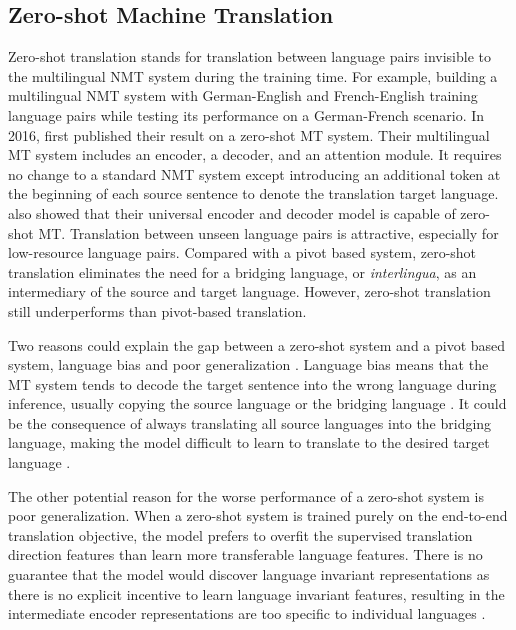 \documentclass[thesis,fonts=libertine]{cluu}
\begin{document}
\subsection{Zero-shot Machine Translation}
\label{sec:zero_shot_mt}

Zero-shot translation stands for translation between language pairs invisible to the multilingual NMT system during the training time. For example, building a multilingual NMT system with German-English and French-English training language pairs while testing its performance on a German-French scenario. In 2016, \textcite{Johnson:2016aa} first published their result on a zero-shot MT system. Their multilingual MT system includes an encoder, a decoder, and an attention module. It requires no change to a standard NMT system except introducing an additional token at the beginning of each source sentence to denote the translation target language. \textcite{Ha:2016aa} also showed that their universal encoder and decoder model is capable of zero-shot MT. Translation between unseen language pairs is attractive, especially for low-resource language pairs. Compared with a pivot based system, zero-shot translation eliminates the need for a bridging language, or \textit{interlingua}, as an intermediary of the source and target language. However, zero-shot translation still underperforms than pivot-based translation.

Two reasons could explain the gap between a zero-shot system and a pivot based system, language bias \parencite{Ha:2016aa, Ha:2017aa, Arivazhagan:2019aa} and poor generalization \parencite{Arivazhagan:2019aa}. Language bias means that the MT system tends to decode the target sentence into the wrong language during inference, usually copying the source language or the bridging language \textcite{Ha:2016aa}. It could be the consequence of always translating all source languages into the bridging language, making the model difficult to learn to translate to the desired target language \parencite{Arivazhagan:2019aa}.

The other potential reason for the worse performance of a zero-shot system is poor generalization. When a zero-shot system is trained purely on the end-to-end translation objective, the model prefers to overfit the supervised translation direction features than learn more transferable language features. There is no guarantee that the model would discover language invariant representations as there is no explicit incentive to learn language invariant features, resulting in the intermediate encoder representations are too specific to individual languages \parencite{Arivazhagan:2019aa}.
\end{document}
